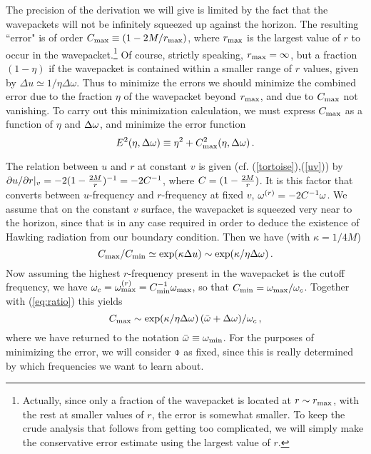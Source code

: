 The precision of the derivation we will give is limited by the
fact that the wavepackets will not be infinitely squeezed up against
the horizon. The resulting ``error" is of order
$C_{\rm max}\equiv (1-2M/r_{\rm max})$, where $r_{\rm max}$ is the
largest value of $r$ to occur in the wavepacket.\footnote{Actually, since
only a fraction of the wavepacket is located at
$r\sim r_{\rm max}$, with
the rest at smaller values of $r$, the error is somewhat smaller.
To keep the crude analysis that follows from getting too complicated,
we will simply make the conservative error estimate using the largest
value of $r$.}
Of course, strictly speaking, $r_{\rm max}=\infty$, but a fraction
$(1-\eta)$ if the wavepacket is contained within a smaller range
of $r$ values, given by $\Delta u\simeq 1/\eta\Delta\omega$.
Thus to minimize the errors we should minimize the combined error due to
the fraction $\eta$ of the wavepacket beyond $r_{\rm max}$, and
due to $C_{\rm max}$ not vanishing.
To carry out this minimization calculation, we must express
$C_{\rm max}$ as a function of $\eta$ and $\Delta\omega$,
and minimize the error function
\begin{equation}
E^2(\eta,\Delta\omega)\equiv\eta^2+C_{\rm max}^2(\eta,\Delta\omega)\, .
\label{eq:E}
\end{equation}

The relation between $u$ and $r$ at constant $v$ is given
(cf. (\ref{tortoise}),(\ref{uv})) by
$\partial u/\partial r|_v=-2(1-{2M\over r})^{-1}= -2C^{-1}$,
where $C=(1-{2M\over r})$. It is this factor
that converts between $u$-frequency and $r$-frequency
at fixed $v$, $\omega^{(r)}=-2C^{-1}\omega$.
We assume that on the constant $v$ surface, the wavepacket is squeezed
very near to the horizon, since that is in any case required in order
to deduce the existence of Hawking radiation from our boundary condition.
Then we have (with $\kappa=1/4M$)
\begin{equation}C_{\rm max}/C_{\rm min}\simeq
\exp(\kappa\Delta u)
\sim \exp(\kappa/\eta\Delta\omega)\, .
\label{eq:ratio}
\end{equation}
Now assuming the highest $r$-frequency present in the wavepacket is
the cutoff frequency, we have
$\omega_c=\omega^{(r)}_{\rm max}=C_{\rm min}^{-1}\omega_{\rm max}$,
so that $C_{\rm min}=\omega_{\rm max}/\omega_c$.
Together with (\ref{eq:ratio}) this yields
\begin{equation}
C_{\rm max}\sim \exp(\kappa/\eta\Delta\omega)\,
(\bar{\omega}+\Delta\omega)/\omega_c\, ,
\label{eq:cmax}
\end{equation}
where we have returned to the notation
$\bar{\omega}\equiv\omega_{\rm min}$.
For the purposes of minimizing the error, we will consider
$\obar$ as fixed, since this is really determined by which
frequencies we want to learn about.

